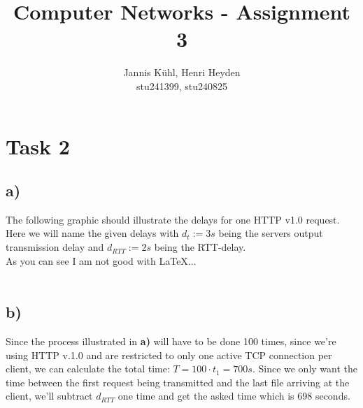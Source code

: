 \documentclass[12pt, a4paper]{article}
\title{Computer Networks - Assignment 3}
\author{Jannis Kühl, Henri Heyden\\ \small stu241399, stu240825}
\date{}
\begin{document}
\vspace{-5cm}
\maketitle

\section*{Task 2}
\subsection*{a)}
The following graphic should illustrate the delays for one HTTP v1.0 request. \\
Here we will name the given delays with \(d_t := 3s\) being the servers output transmission delay and \(d_{RTT} := 2s\) being the RTT-delay. \\
As you can see I am not good with \LaTeX... \\ \\
\subsection*{b)}
Since the process illustrated in \textbf{a)} will have to be done 100 times, since we're using HTTP v.1.0 and are restricted to only one active TCP connection per client, we can calculate the total time: \(T = 100 \cdot t_1 = 700s\). Since we only want the time between the first request being transmitted and the last file arriving at the client, we'll subtract \(d_{RTT}\) one time and get the asked time which is 698 seconds. \\
\end{document}
